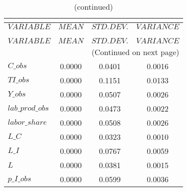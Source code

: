  
\begin{center}
\begin{longtable}{lccc} 
\caption{THEORETICAL MOMENTS}\\
 \label{Table:th_moments}\\
\toprule 
$VARIABLE        $	 & 	 $         MEAN$	 & 	 $    STD. DEV.$	 & 	 $     VARIANCE$\\
\midrule \endfirsthead 
\caption{(continued)}\\
 \toprule \\ 
$VARIABLE        $	 & 	 $         MEAN$	 & 	 $    STD. DEV.$	 & 	 $     VARIANCE$\\
\midrule \endhead 
\midrule \multicolumn{4}{r}{(Continued on next page)} \\ \bottomrule \endfoot 
\bottomrule \endlastfoot 
$C\_obs          $	 & 	       0.0000	 & 	       0.0401	 & 	       0.0016 \\ 
$TI\_obs         $	 & 	       0.0000	 & 	       0.1151	 & 	       0.0133 \\ 
$Y\_obs          $	 & 	       0.0000	 & 	       0.0507	 & 	       0.0026 \\ 
$lab\_prod\_obs  $	 & 	       0.0000	 & 	       0.0473	 & 	       0.0022 \\ 
$labor\_share    $	 & 	       0.0000	 & 	       0.0508	 & 	       0.0026 \\ 
$L\_C            $	 & 	       0.0000	 & 	       0.0323	 & 	       0.0010 \\ 
$L\_I            $	 & 	       0.0000	 & 	       0.0767	 & 	       0.0059 \\ 
$L               $	 & 	       0.0000	 & 	       0.0381	 & 	       0.0015 \\ 
$p\_I\_obs       $	 & 	       0.0000	 & 	       0.0599	 & 	       0.0036 \\ 
\end{longtable}
 \end{center}
